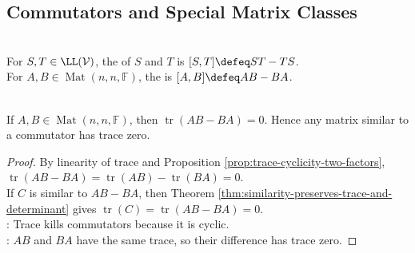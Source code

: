 \subsection{Commutators and Special Matrix Classes}

\begin{definition} \\
For $S,T\in\LL(\mathcal{V})$, the  of $S$ and $T$ is $[S,T]\defeq ST-TS$.\\
For $A,B\in\operatorname{Mat}(n,n,\mathbb{F})$, the  is $[A,B]\defeq AB-BA$.
\end{definition}

\begin{proposition} \label{prop:commutators-have-zero-trace} \\
If $A,B\in\operatorname{Mat}(n,n,\mathbb{F})$, then $\operatorname{tr}(AB-BA)=0$. Hence any matrix similar to a commutator has trace zero.
\begin{proof}
By linearity of trace and Proposition \ref{prop:trace-cyclicity-two-factors}, $\operatorname{tr}(AB-BA)=\operatorname{tr}(AB)-\operatorname{tr}(BA)=0$.\\
If $C$ is similar to $AB-BA$, then Theorem \ref{thm:similarity-preserves-trace-and-determinant} gives $\operatorname{tr}(C)=\operatorname{tr}(AB-BA)=0$.\\
: Trace kills commutators because it is cyclic.\\
: $AB$ and $BA$ have the same trace, so their difference has trace zero.
\end{proof}
\end{proposition}

